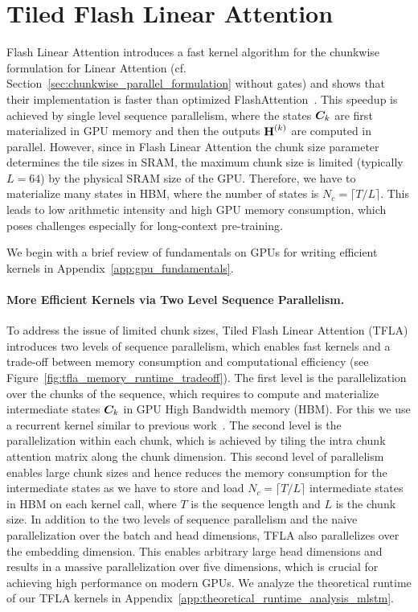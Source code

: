 \documentclass{article}
\begin{document}
\section{Tiled Flash Linear Attention}
\label{sec:tiledflashlinearattention}
\vspace{-0.2cm}
Flash Linear Attention \citep{yang:24gated} introduces a fast kernel algorithm for the chunkwise formulation for Linear Attention (cf. Section~\ref{sec:chunkwise_parallel_formulation} without gates) and shows that their implementation is faster than optimized FlashAttention~\citep{dao:23flashattention2}.
This speedup is achieved by single level sequence parallelism, where the states $\bm{C}_{k}$ are first materialized in GPU memory and then the outputs $\bm{\mathrm{H}}^{(k)}$ are computed in parallel.
However, since in Flash Linear Attention the chunk size parameter determines the tile sizes in SRAM, the maximum chunk size is limited (typically $L=64$) by the physical SRAM size of the GPU. Therefore, we have to materialize many states in HBM, where the number of states is $N_c = \lceil T/L \rceil$.
This leads to low arithmetic intensity and high GPU memory consumption, which poses challenges especially for long-context pre-training.

We begin with a brief review of fundamentals on GPUs for writing efficient kernels in Appendix~\ref{app:gpu_fundamentals}.





\vspace{-0.1cm}
\paragraph{More Efficient Kernels via Two Level Sequence Parallelism.}
\label{sec:tfla_work_partitioning}
\vspace{-0.1cm}
To address the issue of limited chunk sizes, Tiled Flash Linear Attention (TFLA) introduces two levels of sequence parallelism, which enables fast kernels and a trade-off between memory consumption and computational efficiency (see Figure~\ref{fig:tfla_memory_runtime_tradeoff}).
The first level is the parallelization over the chunks of the sequence, which requires to compute and materialize intermediate states $\bm{C}_{k}$ in GPU High Bandwidth memory (HBM).
For this we use a recurrent kernel similar to previous work~\citep{yang:24gated}.
The second level is the parallelization within each chunk, which is achieved by tiling the intra chunk attention matrix along the chunk dimension.
This second level of parallelism enables large chunk sizes and hence reduces the memory consumption for the intermediate states as we have to store and load $N_c = \lceil T/L \rceil$ intermediate states in HBM on each kernel call, where $T$ is the sequence length and $L$ is the chunk size.
In addition to the two levels of sequence parallelism and the naive parallelization over the batch and head dimensions, TFLA also parallelizes over the embedding dimension. 
This enables arbitrary large head dimensions and results in a massive parallelization over five dimensions, which is crucial for achieving high performance on modern GPUs.
We analyze the theoretical runtime of our TFLA kernels in Appendix~\ref{app:theoretical_runtime_analysis_mlstm}.
\vspace{-0.2cm}
\end{document}
